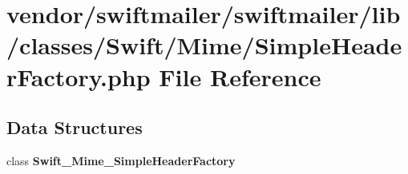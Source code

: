 \section{vendor/swiftmailer/swiftmailer/lib/classes/\+Swift/\+Mime/\+Simple\+Header\+Factory.php File Reference}
\label{_simple_header_factory_8php}
\subsection*{Data Structures}
\begin{DoxyCompactItemize}
\item 
class {\bf Swift\+\_\+\+Mime\+\_\+\+Simple\+Header\+Factory}
\end{DoxyCompactItemize}

